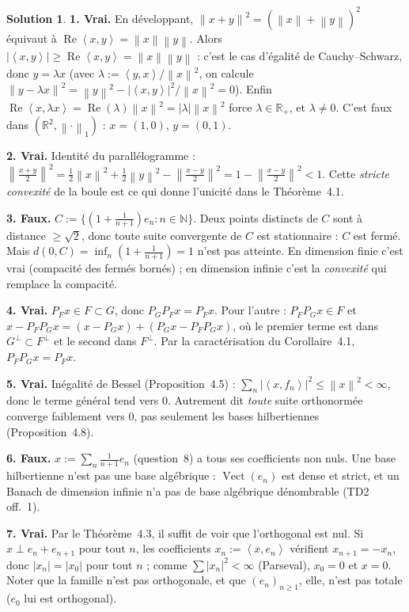 \documentclass[11pt,a4paper]{article}
\newcommand{\R}{\mathbb{R}}
\newcommand{\N}{\mathbb{N}}
\newcommand{\Vect}{\operatorname{Vect}}
\newcommand{\norm}[1]{\left\|#1\right\|}
\newcommand{\ps}[2]{\left\langle #1,#2\right\rangle}
\renewcommand{\Re}{\operatorname{Re}}
\theoremstyle{definition}
\newtheorem*{solution}{Solution}
\begin{document}
\begin{solution}
\noindent\textbf{1. Vrai.} En développant, $\norm{x+y}^2=(\norm x+\norm y)^2$ équivaut à $\Re\ps xy=\norm x\norm y$. Alors $|\ps xy|\ge\Re\ps xy=\norm x\norm y$ : c'est le cas d'égalité de Cauchy--Schwarz, donc $y=\lambda x$ (avec $\lambda:=\ps yx/\norm x^2$, on calcule $\norm{y-\lambda x}^2=\norm y^2-|\ps xy|^2/\norm x^2=0$). Enfin $\Re\ps x{\lambda x}=\Re(\lambda)\norm x^2=|\lambda|\norm x^2$ force $\lambda\in\R_+$, et $\lambda\ne0$. C'est faux dans $(\R^2,\norm\cdot_1)$ : $x=(1,0)$, $y=(0,1)$.

\medskip
\noindent\textbf{2. Vrai.} Identité du parallélogramme : $\norm{\frac{x+y}2}^2=\frac12\norm x^2+\frac12\norm y^2-\norm{\frac{x-y}2}^2=1-\norm{\frac{x-y}2}^2<1$. Cette \emph{stricte convexité} de la boule est ce qui donne l'unicité dans le Théorème~4.1.

\medskip
\noindent\textbf{3. Faux.} $C:=\{(1+\frac1{n+1})e_n:n\in\N\}$. Deux points distincts de $C$ sont à distance $\ge\sqrt2$, donc toute suite convergente de $C$ est stationnaire : $C$ est fermé. Mais $d(0,C)=\inf_n(1+\frac1{n+1})=1$ n'est pas atteinte. En dimension finie c'est vrai (compacité des fermés bornés) ; en dimension infinie c'est la \emph{convexité} qui remplace la compacité.

\medskip
\noindent\textbf{4. Vrai.} $P_Fx\in F\subset G$, donc $P_GP_Fx=P_Fx$. Pour l'autre : $P_FP_Gx\in F$ et $x-P_FP_Gx=(x-P_Gx)+(P_Gx-P_FP_Gx)$, où le premier terme est dans $G^\perp\subset F^\perp$ et le second dans $F^\perp$. Par la caractérisation du Corollaire~4.1, $P_FP_Gx=P_Fx$.

\medskip
\noindent\textbf{5. Vrai.} Inégalité de Bessel (Proposition~4.5) : $\sum_n|\ps x{f_n}|^2\le\norm x^2<\infty$, donc le terme général tend vers $0$. Autrement dit \emph{toute} suite orthonormée converge faiblement vers $0$, pas seulement les bases hilbertiennes (Proposition~4.8).

\medskip
\noindent\textbf{6. Faux.} $x:=\sum_n\frac1{n+1}e_n$ (question~8) a tous ses coefficients non nuls. Une base hilbertienne n'est pas une base algébrique : $\Vect(e_n)$ est dense et strict, et un Banach de dimension infinie n'a pas de base algébrique dénombrable (TD2 off.~1).

\medskip
\noindent\textbf{7. Vrai.} Par le Théorème~4.3, il suffit de voir que l'orthogonal est nul. Si $x\perp e_n+e_{n+1}$ pour tout $n$, les coefficients $x_n:=\ps x{e_n}$ vérifient $x_{n+1}=-x_n$, donc $|x_n|=|x_0|$ pour tout $n$ ; comme $\sum|x_n|^2<\infty$ (Parseval), $x_0=0$ et $x=0$. Noter que la famille n'est pas orthogonale, et que $(e_n)_{n\ge1}$, elle, n'est pas totale ($e_0$ lui est orthogonal).


\end{solution}
\end{document}
